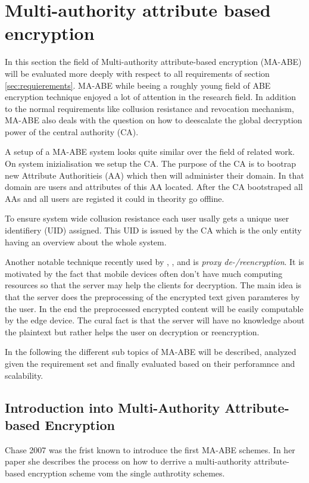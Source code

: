 \section{Multi-authority attribute based encryption}
In this section the field of Multi-authority attribute-based encryption (MA-ABE) will be evaluated more deeply with respect to all requirements of section \ref{sec:requierements}. MA-ABE while beeing a roughly young field of ABE encryption technique enjoyed a lot of attention in the research field. 
In addition to the normal requirements like collusion resistance and revocation mechanism, MA-ABE also deals with the question on how to deescalate the global decryption power of the central authority (CA). 

A setup of a MA-ABE system looks quite similar over the field of related work. On system inizialisation we setup the CA. The purpose of the CA is to bootrap new Attribute Authoritieis (AA) which then will administer their domain. In that domain are users and attributes of this AA located. After the CA bootstraped all AAs and all users are registed it could in theority go offline. 

To ensure system wide collusion resistance each user usally gets a unique user identifiery (UID) assigned. This UID is issued by the CA which is the only entity having an overview about the whole system. 

Another notable technique recently used by \cite{yang2013dac}, \cite{wu2017security}, \cite{li2017two} and \cite{wang2011hierarchical} is \textit{proxy de-/reencryption}. It is motivated by the fact that mobile devices often don't have much computing resources so that the server may help the clients for decryption. The main idea is that the server does the preprocessing of the encrypted text given paramteres by the user. In the end the preprocessed encrypted content will be easily computable by the edge device. The cural fact is that the server will have no knowledge about the plaintext but rather helps the user on decryption or reencryption. 

In the following the different sub topics of MA-ABE will be described, analyzed given the requirement set and finally evaluated based on their perforamnce and scalability. 

\subsection{Introduction into Multi-Authority Attribute-based Encryption}
Chase 2007 \cite{chase2007multi} was the frist known to introduce the first MA-ABE schemes. In her paper she describes the process on how to derrive a multi-authority attribute-based encryption scheme vom the single authrotity schemes. 

